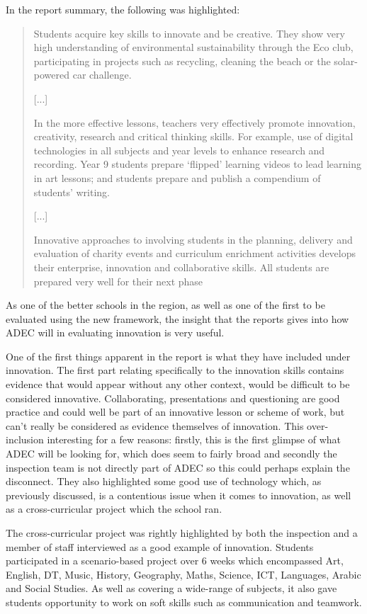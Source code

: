 In the report summary, the following was highlighted:
\begin{quote}
Students acquire key skills to innovate and be creative. They show very high understanding of environmental sustainability through the Eco club, participating in projects such as recycling, cleaning the beach or the solar-powered car challenge.

[...]

In the more effective lessons, teachers very effectively promote innovation, creativity, research and critical thinking skills. For example, use of digital technologies in all subjects and year levels to enhance research and recording. Year 9 students prepare ‘flipped’ learning videos to lead learning in art lessons; and students prepare and publish a compendium of students’ writing.

[...]

Innovative approaches to involving students in the planning, delivery and evaluation of charity events and curriculum enrichment activities develops their enterprise, innovation and collaborative skills. All students are prepared very well for their next phase
\end{quote}

As one of the better schools in the region, as well as one of the first to be evaluated using the new framework, the insight that the reports gives into how ADEC will in evaluating innovation is very useful.

One of the first things apparent in the report is what they have included under innovation. The first part relating specifically to the innovation skills contains evidence that would appear without any other context, would be difficult to be considered innovative. Collaborating, presentations and questioning are good practice and could well be part of an innovative lesson or scheme of work, but can't really be considered as evidence themselves of innovation. This over-inclusion interesting for a few reasons: firstly, this is the first glimpse of what ADEC will be looking for, which does seem to fairly broad and secondly the inspection team is not directly part of ADEC so this could perhaps explain the disconnect. They also highlighted some good use of technology which, as previously discussed, is a contentious issue when it comes to innovation, as well as a cross-curricular project which the school ran.

The cross-curricular project was rightly highlighted by both the inspection and a member of staff interviewed as a good example of innovation. Students participated in a scenario-based project over 6 weeks which encompassed Art, English, DT, Music, History, Geography, Maths, Science, ICT, Languages, Arabic and Social Studies. As well as covering a wide-range of subjects, it also gave students opportunity to work on soft skills such as communication and teamwork. 

